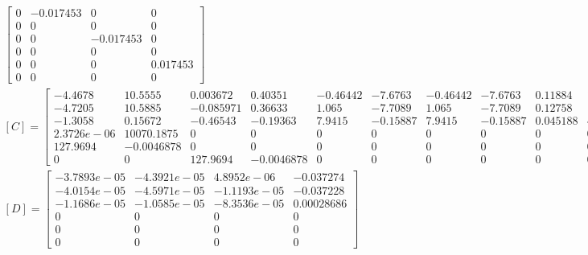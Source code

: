 \begin{landscape}
\begin{gather*}
\begin{bmatrix}
		0&-0.017453&0&0\\
		0&0&0&0\\
		0&0&-0.017453&0\\
		0&0&0&0\\
		0&0&0&0.017453\\
		0&0&0&0
	\end{bmatrix} \\
	[C] = \begin{bmatrix}
		-4.4678&10.5555&0.003672&0.40351&-0.46442&-7.6763&-0.46442&-7.6763&0.11884&153.1878&0.21724&162.964&-0.035862&-17.3488&144.925&17184.8658\\
		-4.7205&10.5885&-0.085971&0.36633&1.065&-7.7089&1.065&-7.7089&0.12758&161.4101&0.22579&169.8046&0.081999&39.6682&145.5045&17210.087\\
		-1.3058&0.15672&-0.46543&-0.19363&7.9415&-0.15887&7.9415&-0.15887&0.045188&42.4782&0.044078&35.2916&0.61198&296.0565&2.8082&107.1983\\
		2.3726e-06&10070.1875&0&0&0&0&0&0&0&0&0&0&0&0&0&0\\
		127.9694&-0.0046878&0&0&0&0&0&0&0&0&0&0&0&0&0&0\\
		0&0&127.9694&-0.0046878&0&0&0&0&0&0&0&0&0&0&0&0
	\end{bmatrix} \\
	[D] = \begin{bmatrix}
		-3.7893e-05&-4.3921e-05&4.8952e-06&-0.037274\\
		-4.0154e-05&-4.5971e-05&-1.1193e-05&-0.037228\\
		-1.1686e-05&-1.0585e-05&-8.3536e-05&0.00028686\\
		0&0&0&0\\
		0&0&0&0\\
		0&0&0&0
	\end{bmatrix}
\end{gather*}
\end{landscape}